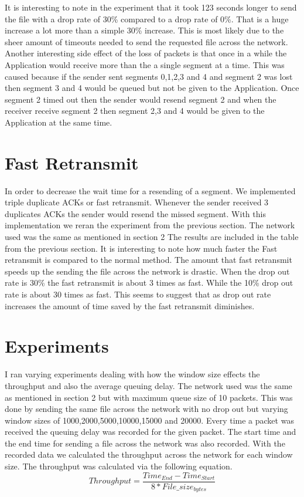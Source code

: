 \documentclass{article}
\begin{document}
It is interesting to note in the experiment that it took 123 seconds longer to send the file with a drop rate of 30\% compared to a drop rate of 0\%.
That is a huge increase a lot more than a simple 30\% increase.
This is most likely due to the sheer amount of timeouts needed to send the requested file across the network.
Another interesting side effect of the loss of packets is that once in a while the Application would receive more than the a single segment at a time.
This was caused because if the sender sent segments 0,1,2,3 and 4 and segment 2 was lost then segment 3 and 4 would be queued but not be given to the Application.
Once segment 2 timed out then the sender would resend segment 2 and when the receiver receive segment 2 then segment 2,3 and 4 would be given to the Application at the same time.



\section{Fast Retransmit}

In order to decrease the wait time for a resending of a segment. We implemented triple duplicate ACKs or fast retransmit.
Whenever the sender received 3 duplicates ACKs the sender would resend the missed segment.
With this implementation we reran the experiment from the previous section.
The network used was the same as mentioned in section 2
The results are included in the table from the previous section.
It is interesting to note how much faster the Fast retransmit is compared to the normal method.
The amount that fast retransmit speeds up the sending the file across the network is drastic. 
When the drop out rate is 30\% the fast retransmit is about 3 times as fast.
While the 10\% drop out rate is about 30 times  as fast.
This seems to suggest that as drop out rate increases the amount of time saved by the fast retransmit diminishes. 

\section{Experiments}
I ran varying experiments dealing with how the window size effects the throughput and also  the average  queuing delay.
The network used was the same as mentioned in section 2 but with maximum queue size of 10 packets.
This was done by sending the same file across the network with no drop out but varying window sizes of 1000,2000,5000,10000,15000 and 20000.
Every time a packet was received the queuing delay was recorded for the given packet.
The start time and the end time for sending a file across the network was also recorded.
With the recorded data we calculated the throughput across the network for each window size.
The throughput was calculated via the following equation. 
\textbf{\begin{equation}
    Throughput = \frac{Time_{End} - Time_{Start}}{8 * File\_size_{bytes}}
\end{equation}}
\end{document}

